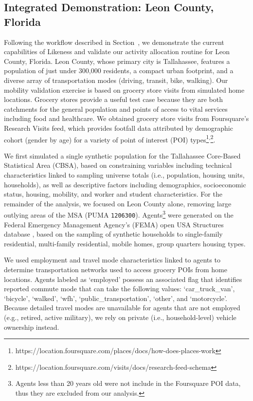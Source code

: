 \subsection{Integrated Demonstration: Leon County, Florida} \label{section:LCFL}

Following the workflow described in Section~, we demonstrate the current capabilities of Likeness and validate our activity allocation routine for Leon County, Florida. Leon County, whose primary city is Tallahassee, features a population of just under 300,000 residents, a compact urban footprint, and a diverse array of transportation modes (driving, transit, bike, walking). Our mobility validation exercise is based on grocery store visits from simulated home locations. Grocery stores provide a useful test case because they are both catchments for the general population and points of access to vital services including food and healthcare. We obtained grocery store visits from Foursquare's Research Visits feed, which provides footfall data attributed by demographic cohort (gender by age) for a variety of point of interest (POI) types\footnote{https://location.foursquare.com/places/docs/how-does-places-work}\textsuperscript{,}\footnote{https://location.foursquare.com/visits/docs/research-feed-schema}. 

We first simulated a single synthetic population for the Tallahassee Core-Based Statistical Area (CBSA), based on constraining variables including technical characteristics linked to sampling universe totals (i.e., population, housing units, households), as well as descriptive factors including demographics, socioeconomic status, housing, mobility, and worker and student characteristics. For the remainder of the analysis, we focused on Leon County alone, removing large outlying areas of the MSA (PUMA \texttt{1206300}). Agents\footnote{Agents less than 20 years old were not include in the Foursquare POI data, thus they are excluded from our analysis.} were generated on the Federal Emergency Management Agency's (FEMA) open USA Structures database \cite{yang2018building, usa_struct_2022}, based on the sampling of synthetic households to single-family residential, multi-family residential, mobile homes, group quarters housing types.

We used employment and travel mode characteristics linked to agents to determine transportation networks used to access grocery POIs from home locations. Agents labeled as `employed' possess an associated flag that identifies reported commute mode that can take the following values: `car\_truck\_van', `bicycle', `walked', `wfh', `public\_transportation', `other', and `motorcycle'. Because detailed travel modes are unavailable for agents that are not employed (e.g., retired, active military), we rely on private (i.e., household-level) vehicle ownership instead.

